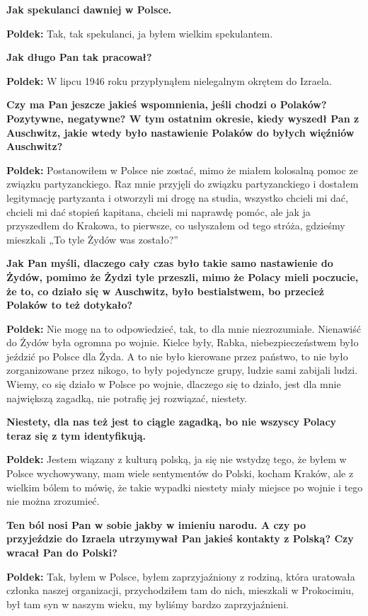 \textbf{Jak spekulanci dawniej w Polsce.}\par  
\textbf{Poldek:} Tak, tak spekulanci, ja byłem wielkim spekulantem.\par  
\textbf{Jak długo Pan tak pracował?}\par 
\textbf{Poldek:} W lipcu 1946 roku przypłynąłem nielegalnym okrętem do Izraela.\par  
\textbf{Czy ma Pan jeszcze jakieś wspomnienia, jeśli chodzi o Polaków? Pozytywne, negatywne? W tym ostatnim okresie, kiedy wyszedł Pan z Auschwitz, jakie wtedy było nastawienie Polaków do byłych więźniów Auschwitz?}\par
\textbf{Poldek:} Postanowiłem w Polsce nie zostać, mimo że miałem kolosalną pomoc ze związku partyzanckiego. Raz mnie przyjęli do związku partyzanckiego i dostałem legitymację partyzanta i otworzyli mi drogę na studia, wszystko chcieli mi dać, chcieli mi dać stopień kapitana, chcieli mi naprawdę pomóc, ale jak ja przyszedłem do Krakowa, to pierwsze, co usłyszałem od tego stróża, gdzieśmy mieszkali „To tyle Żydów was zostało?”\par
\textbf{Jak Pan myśli, dlaczego cały czas było takie samo nastawienie do Żydów, pomimo że Żydzi tyle przeszli, mimo że Polacy mieli poczucie, że to, co działo się w Auschwitz, było bestialstwem, bo przecież Polaków to też dotykało?}\par  
\textbf{Poldek:} Nie mogę na to odpowiedzieć, tak, to dla mnie niezrozumiałe. Nienawiść do Żydów była ogromna po wojnie. Kielce były, Rabka, niebezpieczeństwem było jeździć po Polsce dla Żyda. A to nie było kierowane przez państwo, to nie było zorganizowane przez nikogo, to były pojedyncze grupy, ludzie sami zabijali ludzi. Wiemy, co się działo w Polsce po wojnie, dlaczego się to działo, jest dla mnie największą zagadką, nie potrafię jej rozwiązać, niestety.\par 
\textbf{Niestety, dla nas też jest to ciągle zagadką, bo nie wszyscy Polacy teraz się z tym identyfikują.}\par
\textbf{Poldek:} Jestem wiązany z kulturą polską, ja się nie wstydzę tego, że byłem w Polsce wychowywany, mam wiele sentymentów do Polski, kocham Kraków, ale z wielkim bólem to mówię, że takie wypadki niestety miały miejsce po wojnie i tego nie można zrozumieć.\par 
\textbf{Ten ból nosi Pan w sobie jakby w imieniu narodu. A czy po przyjeździe do Izraela utrzymywał Pan jakieś kontakty z Polską? Czy wracał Pan do Polski?}\par  
\textbf{Poldek:} Tak, byłem w Polsce, byłem zaprzyjaźniony z rodziną, która uratowała członka naszej organizacji, przychodziłem tam do nich, mieszkali w Prokocimiu, był tam syn w naszym wieku, my byliśmy bardzo zaprzyjaźnieni.\par
